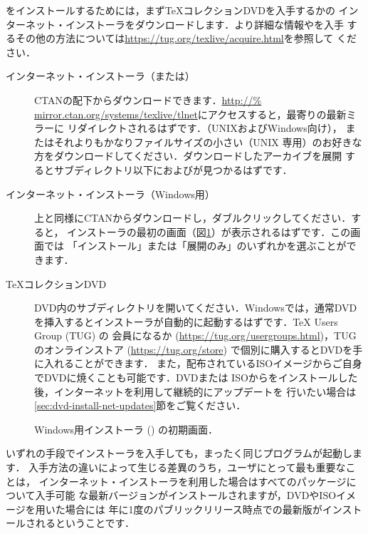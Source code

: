 \documentclass[uplatex,dvipdfmx,tombow]{jsarticle}
\begin{document}
\TL をインストールするためには，まず\TeX コレクションDVDを入手するか\TL の
インターネット・インストーラをダウンロードします．より詳細な情報や\TL を入手
するその他の方法については\url{https://tug.org/texlive/acquire.html}を参照して
ください．
%
\begin{description}
\item[インターネット・インストーラ（または）]
CTANの配下からダウンロードできます．\url{http://%
mirror.ctan.org/systems/texlive/tlnet}にアクセスすると，最寄りの最新ミラーに
リダイレクトされるはずです．（UNIXおよびWindows向け），
またはそれよりもかなりファイルサイズの小さい（UNIX%
専用）のお好きな方をダウンロードしてください．ダウンロードしたアーカイブを展開
するとサブディレクトリ以下におよびが見つかるはずです．

\item[インターネット・インストーラ（Windows用）]
上と同様にCTANからダウンロードし，ダブルクリックしてください．すると，
インストーラの最初の画面（図\ref{fig:nsis}）が表示されるはずです．この画面では
「インストール」または「展開のみ」のいずれかを選ぶことができます．

\item[\TeX コレクションDVD]
DVD内のサブディレクトリを開いてください．Windowsでは，通常DVD
を挿入するとインストーラが自動的に起動するはずです．{\TeX} Users Group (TUG) の
会員になるか (\url{https://tug.org/usergroups.html})，TUGのオンラインストア
(\url{https://tug.org/store}) で個別に購入するとDVDを手に入れることができます．
また，配布されているISOイメージからご自身でDVDに焼くことも可能です．DVDまたは
ISOから\TL をインストールした後，インターネットを利用して継続的にアップデートを
行いたい場合は\ref{sec:dvd-install-net-updates}節をご覧ください．
\end{description}
%
\begin{figure}[tb]
\caption{Windows用インストーラ () の初期画面．}
\label{fig:nsis}
\end{figure}

いずれの手段でインストーラを入手しても，まったく同じプログラムが起動します．
入手方法の違いによって生じる差異のうち，ユーザにとって最も重要なことは，
インターネット・インストーラを利用した場合はすべてのパッケージについて入手可能
な最新バージョンがインストールされますが，DVDやISOイメージを用いた場合には
年に1度のパブリックリリース時点での最新版がインストールされるということです．
\end{document}
